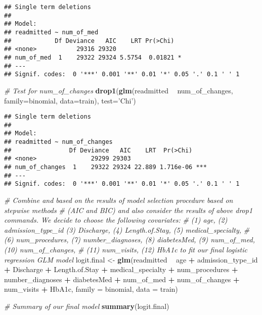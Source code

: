 \documentclass[
]{article}
\newenvironment{Shaded}{\begin{snugshade}}{\end{snugshade}}
\newcommand{\CommentTok}[1]{\textcolor[rgb]{0.56,0.35,0.01}{\textit{#1}}}
\newcommand{\DataTypeTok}[1]{\textcolor[rgb]{0.13,0.29,0.53}{#1}}
\newcommand{\KeywordTok}[1]{\textcolor[rgb]{0.13,0.29,0.53}{\textbf{#1}}}
\newcommand{\NormalTok}[1]{#1}
\newcommand{\OperatorTok}[1]{\textcolor[rgb]{0.81,0.36,0.00}{\textbf{#1}}}
\newcommand{\StringTok}[1]{\textcolor[rgb]{0.31,0.60,0.02}{#1}}
\begin{document}
\begin{verbatim}
## Single term deletions
## 
## Model:
## readmitted ~ num_of_med
##            Df Deviance   AIC    LRT Pr(>Chi)  
## <none>           29316 29320                  
## num_of_med  1    29322 29324 5.5754  0.01821 *
## ---
## Signif. codes:  0 '***' 0.001 '**' 0.01 '*' 0.05 '.' 0.1 ' ' 1
\end{verbatim}

\begin{Shaded}
\begin{Highlighting}[]
\CommentTok{# Test for num_of_changes}
\KeywordTok{drop1}\NormalTok{(}\KeywordTok{glm}\NormalTok{(readmitted }\OperatorTok{~}\StringTok{ }\NormalTok{num_of_changes, }\DataTypeTok{family=}\NormalTok{binomial, }\DataTypeTok{data=}\NormalTok{train), }\DataTypeTok{test=}\StringTok{'Chi'}\NormalTok{)}
\end{Highlighting}
\end{Shaded}

\begin{verbatim}
## Single term deletions
## 
## Model:
## readmitted ~ num_of_changes
##                Df Deviance   AIC    LRT  Pr(>Chi)    
## <none>               29299 29303                     
## num_of_changes  1    29322 29324 22.889 1.716e-06 ***
## ---
## Signif. codes:  0 '***' 0.001 '**' 0.01 '*' 0.05 '.' 0.1 ' ' 1
\end{verbatim}

\begin{Shaded}
\begin{Highlighting}[]
\CommentTok{# Combine and based on the results of model selection procedure based on stepwise methods }
\CommentTok{# (AIC and BIC) and also consider the results of above drop1 commands. We decide to choose the following covariates:}
\CommentTok{# (1) age, (2) admission_type_id (3) Discharge, (4) Length.of.Stay, (5) medical_specialty, }
\CommentTok{# (6) num_procedures, (7) number_diagnoses, (8) diabetesMed, (9) num_of_med, (10) num_of_changes,}
\CommentTok{# (11) num_visits, (12) HbA1c to fit our final logistic regression GLM model}
\NormalTok{logit.final <-}\StringTok{ }\KeywordTok{glm}\NormalTok{(readmitted }\OperatorTok{~}\StringTok{ }\NormalTok{age }\OperatorTok{+}\StringTok{ }\NormalTok{admission_type_id }\OperatorTok{+}\StringTok{ }\NormalTok{Discharge }\OperatorTok{+}\StringTok{ }\NormalTok{Length.of.Stay }\OperatorTok{+}\StringTok{ }\NormalTok{medical_specialty }\OperatorTok{+}\StringTok{ }\NormalTok{num_procedures }\OperatorTok{+}\StringTok{ }\NormalTok{number_diagnoses }\OperatorTok{+}\StringTok{ }\NormalTok{diabetesMed }\OperatorTok{+}\StringTok{ }\NormalTok{num_of_med }\OperatorTok{+}\StringTok{ }\NormalTok{num_of_changes }\OperatorTok{+}\StringTok{ }\NormalTok{num_visits }\OperatorTok{+}\StringTok{ }\NormalTok{HbA1c, }\DataTypeTok{family =}\NormalTok{ binomial, }\DataTypeTok{data =}\NormalTok{ train)}

\CommentTok{# Summary of our final model}
\KeywordTok{summary}\NormalTok{(logit.final)}
\end{Highlighting}
\end{Shaded}
\end{document}

